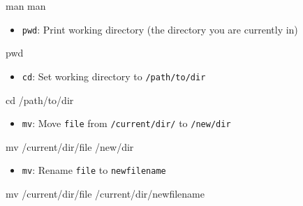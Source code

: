 \documentclass[
]{book}
\newenvironment{Shaded}{\begin{snugshade}}{\end{snugshade}}
\newcommand{\BuiltInTok}[1]{#1}
\newcommand{\FunctionTok}[1]{\textcolor[rgb]{0.00,0.00,0.00}{#1}}
\newcommand{\NormalTok}[1]{#1}
\providecommand{\tightlist}{%
  \setlength{\itemsep}{0pt}\setlength{\parskip}{0pt}}
\begin{document}
\begin{Shaded}
\begin{Highlighting}[]
\FunctionTok{man}\NormalTok{ man}
\end{Highlighting}
\end{Shaded}

\begin{itemize}
\tightlist
\item
  \texttt{pwd}: Print working directory (the directory you are currently in)
\end{itemize}

\begin{Shaded}
\begin{Highlighting}[]
\BuiltInTok{pwd}
\end{Highlighting}
\end{Shaded}

\begin{itemize}
\tightlist
\item
  \texttt{cd}: Set working directory to \texttt{/path/to/dir}
\end{itemize}

\begin{Shaded}
\begin{Highlighting}[]
\BuiltInTok{cd}\NormalTok{ /path/to/dir}
\end{Highlighting}
\end{Shaded}

\begin{itemize}
\tightlist
\item
  \texttt{mv}: Move \texttt{file} from \texttt{/current/dir/} to \texttt{/new/dir}
\end{itemize}

\begin{Shaded}
\begin{Highlighting}[]
\FunctionTok{mv}\NormalTok{ /current/dir/file /new/dir}
\end{Highlighting}
\end{Shaded}

\begin{itemize}
\tightlist
\item
  \texttt{mv}: Rename \texttt{file} to \texttt{newfilename}
\end{itemize}

\begin{Shaded}
\begin{Highlighting}[]
\FunctionTok{mv}\NormalTok{ /current/dir/file /current/dir/newfilename}
\end{Highlighting}
\end{Shaded}
\end{document}
